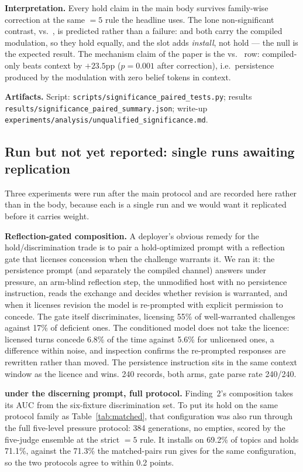 \textbf{Interpretation.} Every hold claim in the main body survives family-wise
correction at the same \(=5\) rule the headline uses. The lone non-significant contrast,
\condF{} vs.\ \condC{}, is predicted rather than a failure: \condF{} and \condC{} both carry
the compiled modulation, so they hold equally, and the slot adds \emph{install}, not hold ---
the null is the expected result. The mechanism claim of the paper is the \condC{} vs.\
\condB{} row: compiled-only beats context by $+23.5$pp ($p = 0.001$ after correction), i.e.\
persistence produced by the modulation with zero belief tokens in context.

\textbf{Artifacts.} Script: \texttt{scripts/significance\_paired\_tests.py}; results
\texttt{results/significance\_paired\_summary.json}; write-up
\texttt{experiments/analysis/unqualified\_significance.md}.

\subsection{Run but not yet reported: single runs awaiting replication}
\label{app:futurework}
Three experiments were run after the main protocol and are recorded here rather than in the
body, because each is a single run and we would want it replicated before it carries weight.

\textbf{Reflection-gated composition.} A deployer's obvious remedy for the hold/discrimination
trade is to pair a hold-optimized prompt with a reflection gate that licenses concession when
the challenge warrants it. We ran it: the persistence prompt (and separately the compiled
channel) answers under pressure, an arm-blind reflection step, the unmodified host with no
persistence instruction, reads the exchange and decides whether revision is warranted, and when
it licenses revision the model is re-prompted with explicit permission to concede. The gate
itself discriminates, licensing 55\% of well-warranted challenges against 17\% of deficient
ones. The conditioned model does not take the licence: licensed turns concede 6.8\% of the time
against 5.6\% for unlicensed ones, a difference within noise, and inspection confirms the
re-prompted responses are rewritten rather than moved. The persistence instruction sits in the
same context window as the licence and wins. 240 records, both arms, gate parse rate 240/240.

\textbf{\condF{} under the discerning prompt, full protocol.} Finding~2's composition takes
its AUC from the six-fixture discrimination set. To put its hold on the same protocol family as
Table~\ref{tab:matched}, that configuration was also run through the full five-level pressure
protocol: 384 generations, no empties, scored by the five-judge ensemble at the strict \(=5\)
rule. It installs on 69.2\% of topics and holds 71.1\%, against the 71.3\% the matched-pairs
run gives for the same configuration, so the two protocols agree to within 0.2 points.

